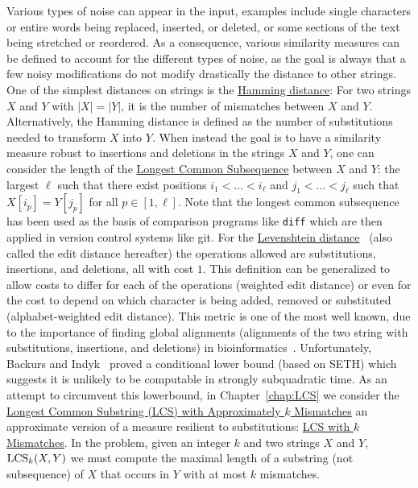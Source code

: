 Various types of noise can appear in the input, examples include single characters or entire words being replaced, inserted, or deleted, or some sections of the text being stretched or reordered. As a consequence, various similarity measures can be defined to account for the different types of noise, as the goal is always that a few noisy modifications do not modify drastically the distance to other strings.
One of the simplest distances on strings is the \underline{Hamming distance}: For two strings $X$ and $Y$ with $|X|=|Y|$, it is the number of mismatches between $X$ and $Y$. Alternatively, the Hamming distance is defined as the number of substitutions needed to transform $X$ into $Y$.
When instead the goal is to have a similarity measure robust to insertions and deletions in the strings $X$ and $Y$, one can consider the length of the \underline{Longest Common Subsequence} between $X$ and $Y$: the largest $\ell$ such that there exist positions $i_1<... < i_\ell$ and $j_1< ... < j_\ell$ such that $X[i_p] = Y[j_p]$ for all $p \in [1,\ell]$. Note that the longest common subsequence has been used as the basis of comparison programs like \texttt{diff} which are then applied in version control systems like git.
For the \underline{Levenshtein distance}~\cite{levenshtein1966binary} (also called the edit distance hereafter) the operations allowed are substitutions, insertions, and deletions, all with cost $1$. This definition can be generalized to allow costs to differ for each of the operations (weighted edit distance) or even for the cost to depend on which character is being added, removed or substituted (alphabet-weighted edit distance). This metric is one of the most well known, due to the importance of finding global alignments (alignments of the two string with substitutions, insertions, and deletions) in bioinformatics~\cite{Gusfield1997}.
Unfortunately, Backurs and Indyk~\cite{DBLP:conf/stoc/BackursI15} proved a conditional lower bound (based on SETH) which suggests it is unlikely to be computable in strongly subquadratic time.
As an attempt to circumvent this lowerbound, in Chapter~\ref{chap:LCS} we consider the \underline{Longest Common Substring (LCS) with Approximately $k$ Mismatches} an approximate version of a measure resilient to substitutions: \underline{LCS with $k$ Mismatches}. In the \kLCS problem, given an integer $k$ and two strings $X$ and $Y$, $\mathrm{LCS}_{k}(X,Y)$ we must compute the maximal length of a substring (not subsequence) of $X$ that occurs in $Y$ with at most $k$ mismatches. 
